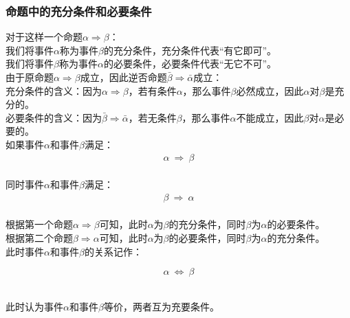 \documentclass[UTF8]{ctexart}
\begin{document}
\newpage

\subsubsection{命题中的充分条件和必要条件}
    \setcounter{equation}{0}
    对于这样一个命题$\alpha\Rightarrow\beta$：\\[3mm]
    我们将事件$\alpha$称为事件$\beta$的充分条件，充分条件代表“有它即可”。\\[3mm]
    我们将事件$\beta$称为事件$\alpha$的必要条件，必要条件代表“无它不可”。\\[6mm]
    由于原命题$\alpha\Rightarrow\beta$成立，因此逆否命题$\bar{\beta}\Rightarrow\bar{\alpha}$成立：\\[3mm]
    充分条件的含义：因为$\alpha\Rightarrow\beta$，若有条件$\alpha$，那么事件$\beta$必然成立，因此$\alpha$对$\beta$是充分的。\\[3mm]
    必要条件的含义：因为$\bar{\beta}\Rightarrow\bar{\alpha}$，若无条件$\beta$，那么事件$\alpha$不能成立，因此$\beta$对$\alpha$是必要的。\\[6mm]
    如果事件$\alpha$和事件$\beta$满足：
    \begin{align}
        \alpha~\Longrightarrow~\beta
    \end{align}\\
    同时事件$\alpha$和事件$\beta$满足：
    \begin{align}
        \beta~\Longrightarrow~\alpha
    \end{align}\\
    根据第一个命题$\alpha\Rightarrow\beta$可知，此时$\alpha$为$\beta$的充分条件，同时$\beta$为$\alpha$的必要条件。\\[3mm]
    根据第二个命题$\beta\Rightarrow\alpha$可知，此时$\alpha$为$\beta$的必要条件，同时$\beta$为$\alpha$的充分条件。\\[3mm]
    此时事件$\alpha$和事件$\beta$的关系记作：
    \begin{large}
        \begin{equation*}
            \alpha~\Longleftrightarrow~\beta
        \end{equation*}
    \end{large}\\
    此时认为事件$\alpha$和事件$\beta$等价，两者互为充要条件。\vspace{5pt}
\end{document}
